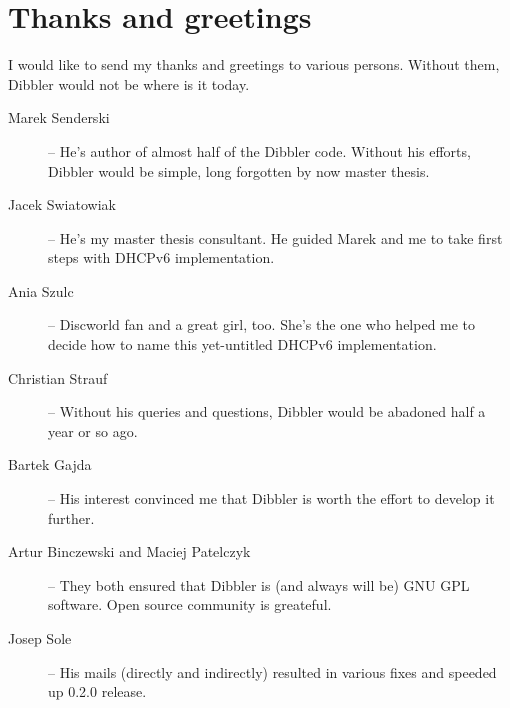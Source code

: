 \section{Thanks and greetings}

I would like to send my thanks and greetings to various persons.
Without them, Dibbler would not be where is it today.
\begin{description}
\item[Marek Senderski] -- He's author of almost half of the Dibbler
  code. Without his efforts, Dibbler would be simple, long forgotten
  by now master thesis.
\item[Jacek Swiatowiak] -- He's my master thesis consultant. He guided 
  Marek and me to take first steps with DHCPv6 implementation.
\item[Ania Szulc] -- Discworld fan and a great girl, too. She's the one
  who helped me to decide how to name this yet-untitled DHCPv6 implementation.
\item[Christian Strauf] -- Without his queries and questions, Dibbler
  would be abadoned half a year or so ago.
\item[Bartek Gajda] -- His interest convinced me that Dibbler is worth
  the effort to develop it further.
\item[Artur Binczewski and Maciej Patelczyk] -- They both ensured that
  Dibbler is (and always will be) GNU GPL software. Open source
  community is greateful.
\item[Josep Sole] -- His mails (directly and indirectly) resulted in
  various fixes and speeded up 0.2.0 release.
\end{description}